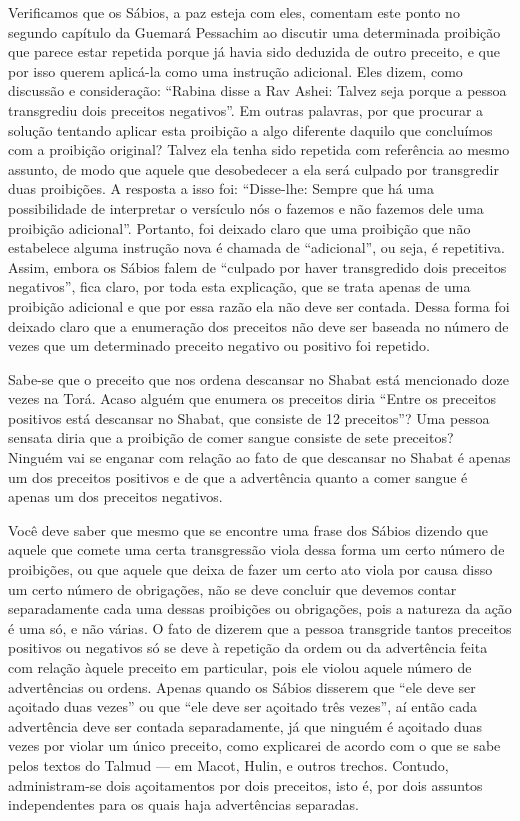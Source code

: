 Verificamos que os Sábios, a paz esteja com eles, comentam este ponto
no segundo capítulo da Guemará Pessachim ao discutir uma determinada
proibição que parece estar repetida porque já havia sido deduzida de
outro preceito, e que por isso querem aplicá-la como uma instrução
adicional. Eles dizem, como discussão e consideração: ``Rabina disse a
Rav Ashei: Talvez seja porque a pessoa transgrediu dois preceitos
negativos''. Em outras palavras, por que procurar a solução tentando
aplicar esta proibição a algo diferente daquilo que concluímos com a
proibição original? Talvez ela tenha sido repetida com referência ao
mesmo assunto, de modo que aquele que desobedecer a ela será culpado por
transgredir duas proibições. A resposta a isso foi: ``Disse-lhe: Sempre
que há uma possibilidade de interpretar o versículo nós o fazemos e não
fazemos dele uma proibição adicional''. Portanto, foi deixado claro que
uma proibição que não estabelece alguma instrução nova é chamada de
``adicional'', ou seja, é repetitiva. Assim, embora os Sábios falem de
``culpado por haver transgredido dois preceitos negativos'', fica
claro, por toda esta explicação, que se trata apenas de uma proibição
adicional e que por essa razão ela não deve ser contada. Dessa forma
foi deixado claro que a enumeração dos preceitos não deve ser baseada no
número de vezes que um determinado preceito negativo ou positivo foi
repetido.

Sabe-se que o preceito que nos ordena descansar no Shabat está
mencionado doze vezes na Torá. Acaso alguém que enumera os preceitos
diria ``Entre os preceitos positivos está descansar no Shabat, que
consiste de 12 preceitos''? Uma pessoa sensata diria que a proibição de comer sangue
consiste de sete preceitos? Ninguém vai se enganar com relação ao fato
de que descansar no Shabat é apenas um dos preceitos positivos e de que
a advertência quanto a comer sangue é apenas um dos preceitos
negativos.

Você deve saber que mesmo que se encontre uma frase dos Sábios dizendo
que aquele que comete uma certa transgressão viola dessa forma um certo
número de proibições, ou que aquele que deixa de fazer um certo ato
viola por causa disso um certo número de obrigações, não se deve
concluir que devemos contar separadamente cada uma dessas proibições ou
obrigações, pois a natureza da ação é uma só, e não várias. O fato de
dizerem que a pessoa transgride tantos preceitos positivos ou negativos
só se deve à repetição da ordem ou da advertência feita com relação
àquele preceito em particular, pois ele violou aquele número de
advertências ou ordens. Apenas quando os Sábios disserem que ``ele deve
ser açoitado duas vezes'' ou que ``ele deve ser açoitado três vezes'',
aí então cada advertência deve ser contada separadamente, já que ninguém
é açoitado duas vezes por violar um único preceito, como explicarei de
acordo com o que se sabe pelos textos do Talmud --- em Macot, Hulin, e
outros trechos. Contudo, administram-se dois açoitamentos por dois
preceitos, isto é, por dois assuntos independentes para os quais haja
advertências separadas.

